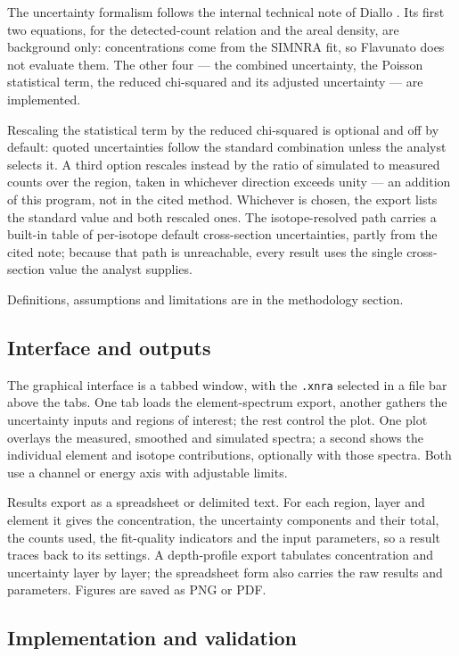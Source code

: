 The uncertainty formalism follows the internal technical note of Diallo
\citep{diallo2025iba}. Its first two equations, for the detected-count
relation and the areal density, are background only: concentrations come
from the SIMNRA fit, so Flavunato does not evaluate them. The other four
--- the combined uncertainty, the Poisson statistical term, the reduced
chi-squared and its adjusted uncertainty --- are implemented.

Rescaling the statistical term by the reduced chi-squared is optional
and off by default: quoted uncertainties follow the standard combination
unless the analyst selects it. A third option rescales instead by the
ratio of simulated to measured counts over the region, taken in
whichever direction exceeds unity --- an addition of this program, not
in the cited method. Whichever is chosen, the export lists the standard
value and both rescaled ones. The isotope-resolved path carries a
built-in table of per-isotope default cross-section uncertainties,
partly from the cited note; because that path is unreachable, every
result uses the single cross-section value the analyst supplies.

Definitions, assumptions and limitations are in the methodology section.

\subsection{Interface and outputs}\label{interface-and-outputs}

The graphical interface is a tabbed window, with the \texttt{.xnra}
selected in a file bar above the tabs. One tab loads the
element-spectrum export, another gathers the uncertainty inputs and
regions of interest; the rest control the plot. One plot overlays the
measured, smoothed and simulated spectra; a second shows the individual
element and isotope contributions, optionally with those spectra. Both
use a channel or energy axis with adjustable limits.

Results export as a spreadsheet or delimited text. For each region,
layer and element it gives the concentration, the uncertainty components
and their total, the counts used, the fit-quality indicators and the
input parameters, so a result traces back to its settings. A
depth-profile export tabulates concentration and uncertainty layer by
layer; the spreadsheet form also carries the raw results and parameters.
Figures are saved as PNG or PDF.

\subsection{Implementation and
validation}\label{implementation-and-validation}


